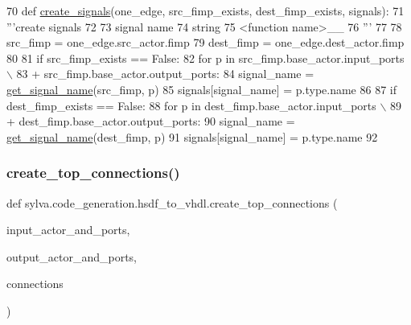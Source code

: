 \begin{DoxyCode}
70 \textcolor{keyword}{def }\hyperlink{namespacesylva_1_1code__generation_1_1hsdf__to__vhdl_a7b3765f9d22f02a29cb6ecfb267ae7f0}{create\_signals}(one\_edge, src\_fimp\_exists, dest\_fimp\_exists, signals):
71     \textcolor{stringliteral}{'''create signals}
72 \textcolor{stringliteral}{}
73 \textcolor{stringliteral}{      signal name}
74 \textcolor{stringliteral}{        string}
75 \textcolor{stringliteral}{        <function name>\_<fimp index>\_<port name>}
76 \textcolor{stringliteral}{    '''}
77 
78     src\_fimp = one\_edge.src\_actor.fimp
79     dest\_fimp = one\_edge.dest\_actor.fimp
80 
81     \textcolor{keywordflow}{if} src\_fimp\_exists == \textcolor{keyword}{False}:
82         \textcolor{keywordflow}{for} p \textcolor{keywordflow}{in} src\_fimp.base\_actor.input\_ports \(\backslash\)
83                 + src\_fimp.base\_actor.output\_ports:
84             signal\_name = \hyperlink{namespacesylva_1_1code__generation_1_1hsdf__to__vhdl_adfe6fda6b02f34c7fd4f2775ced8228f}{get\_signal\_name}(src\_fimp, p)
85             signals[signal\_name] = p.type.name
86 
87     \textcolor{keywordflow}{if} dest\_fimp\_exists == \textcolor{keyword}{False}:
88         \textcolor{keywordflow}{for} p \textcolor{keywordflow}{in} dest\_fimp.base\_actor.input\_ports \(\backslash\)
89                 + dest\_fimp.base\_actor.output\_ports:
90             signal\_name = \hyperlink{namespacesylva_1_1code__generation_1_1hsdf__to__vhdl_adfe6fda6b02f34c7fd4f2775ced8228f}{get\_signal\_name}(dest\_fimp, p)
91             signals[signal\_name] = p.type.name
92 
\end{DoxyCode}
\mbox{\label{namespacesylva_1_1code__generation_1_1hsdf__to__vhdl_a09020e1a1ea5a2d3e4b8cdd35f51a185}} 
\subsubsection{\texorpdfstring{create\+\_\+top\+\_\+connections()}{create\_top\_connections()}}
{\footnotesize\ttfamily def sylva.\+code\+\_\+generation.\+hsdf\+\_\+to\+\_\+vhdl.\+create\+\_\+top\+\_\+connections (\begin{DoxyParamCaption}\item[{}]{input\+\_\+actor\+\_\+and\+\_\+ports,  }\item[{}]{output\+\_\+actor\+\_\+and\+\_\+ports,  }\item[{}]{connections }\end{DoxyParamCaption})}

